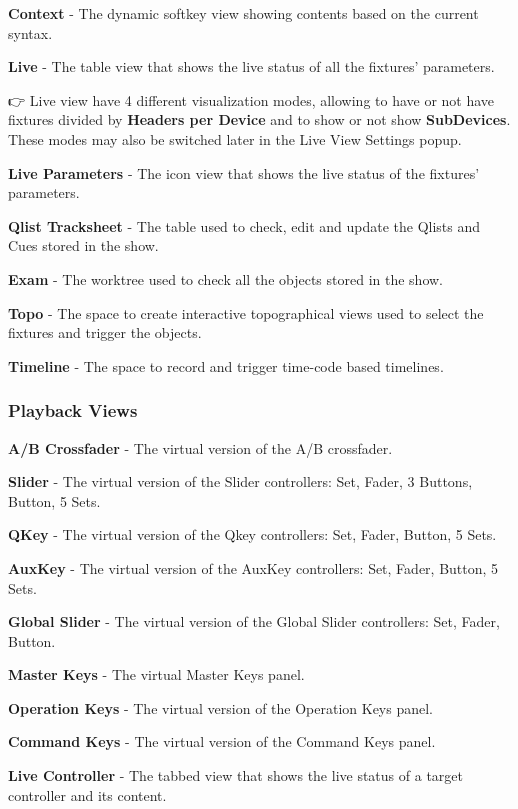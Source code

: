 \documentclass[
]{article}
\begin{document}
\textbf{Context} - The dynamic softkey view showing contents based on the current syntax.

\textbf{Live} - The table view that shows the live status of all the fixtures' parameters.

👉 Live view have 4 different visualization modes, allowing to have or not have fixtures divided by \textbf{Headers per Device} and to show or not show \textbf{SubDevices}. These modes may also be switched later in the Live View Settings popup.

\textbf{Live Parameters} - The icon view that shows the live status of the fixtures' parameters.

\textbf{Qlist Tracksheet} - The table used to check, edit and update the Qlists and Cues stored in the show.

\textbf{Exam} - The worktree used to check all the objects stored in the show.

\textbf{Topo} - The space to create interactive topographical views used to select the fixtures and trigger the objects.

\textbf{Timeline} - The space to record and trigger time-code based timelines.

\hypertarget{playback-views}{%
\subsubsection{Playback Views}\label{playback-views}}

\textbf{A/B Crossfader} - The virtual version of the A/B crossfader.

\textbf{Slider} - The virtual version of the Slider controllers: Set, Fader, 3 Buttons, Button, 5 Sets.

\textbf{QKey} - The virtual version of the Qkey controllers: Set, Fader, Button, 5 Sets.

\textbf{AuxKey} - The virtual version of the AuxKey controllers: Set, Fader, Button, 5 Sets.

\textbf{Global Slider} - The virtual version of the Global Slider controllers: Set, Fader, Button.

\textbf{Master Keys} - The virtual Master Keys panel.

\textbf{Operation Keys} - The virtual version of the Operation Keys panel.

\textbf{Command Keys} - The virtual version of the Command Keys panel.

\textbf{Live Controller} - The tabbed view that shows the live status of a target controller and its content.
\end{document}
